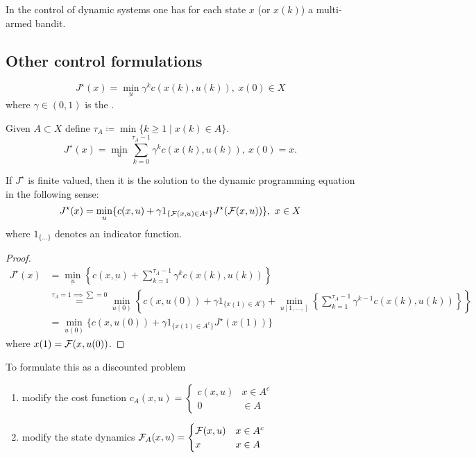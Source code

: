 In the control of dynamic systems one has for each state \(x\) (or \(x(k)\)) a 
multi-armed bandit.

\subsection{Other control formulations}

\[J^\star(x)=\min_{\underbar{u}}\gamma^kc(x(k),u(k)),\ x(0)\in X\]
where \(\gamma\in (0,1)\) is the .

Given \(A\subset X\) define \(\tau_A\coloneqq \min\{k\geq 1\mid x(k)\in A\}\).
\[J^\star(x)=\min_u\sum_{k=0}^{\tau_A-1}\gamma^kc(x(k),u(k)),\ x(0)=x.\]
\begin{proposition}\label{prop:1.18}
    If \(J^\star\) is finite valued, then it is the solution to 
    the dynamic programming equation in the following sense:
    \[J^\star(x)=\min_{u}\{c(x,u)+\gamma1_{\{\mathcal{F}(x,u)\in A^c\}}J^\star(\mathcal{F}(x,u))\},\ x\in X\]
    where \(1_{\{\dots\}}\) denotes an indicator function.
\end{proposition}
\begin{proof}
    \begin{align*}
        J^\star(x)&=\min_{\underbar{u}}\left\{c(x,\underbar{u})+\sum_{k=1}^{\tau_A-1}\gamma^kc(x(k),u(k))\right\}    \\
        &\stackrel{\tau_A=1\implies\sum=0}{=}\min_{u(0)}\left\{c(x,u(0))+\gamma1_{\{x(1)\in A^c\}}+\min_{u[1,\dots,]}\left\{\sum_{k=1}^{\tau_A-1}\gamma^{k-1}c(x(k),u(k))\right\}\right\}\\
        &=\min_{u(0)}\{c(x,u(0))+\gamma1_{\{x(1)\in A^c\}}J^\star(x(1))\}
    \end{align*}
    where \(x(1)=\mathcal{F}(x,u(0))\).
\end{proof}

To formulate this as a discounted problem 
\begin{enumerate}
    \item modify the cost function \(c_A(x,u)=\begin{cases}
        c(x,u) & x\in A^c \\
        0 & \in A 
    \end{cases}\)
    \item modify the state dynamics \(\mathcal{F}_A(x,u)=\begin{cases}
        \mathcal{F}(x,u) & x\in A^c \\
        x & x\in A
    \end{cases}\) 
\end{enumerate}

